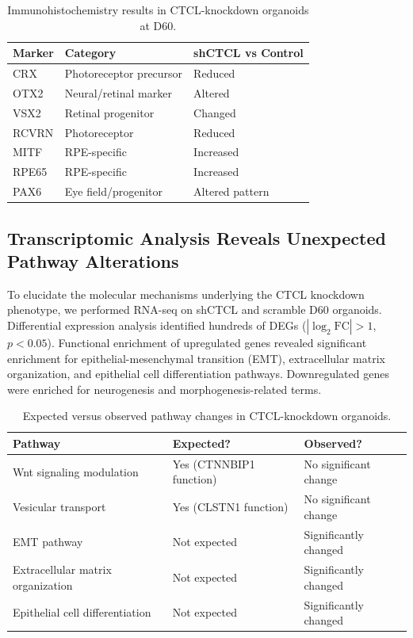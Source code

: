 \documentclass[12pt]{article}
\begin{document}
\begin{table}[htbp]
\centering
\caption{Immunohistochemistry results in CTCL-knockdown organoids at D60.}
\label{tab:ihc}
\begin{tabular}{lll}
\toprule
Marker & Category & shCTCL vs Control \\
\midrule
CRX & Photoreceptor precursor & Reduced \\
OTX2 & Neural/retinal marker & Altered \\
VSX2 & Retinal progenitor & Changed \\
RCVRN & Photoreceptor & Reduced \\
MITF & RPE-specific & Increased \\
RPE65 & RPE-specific & Increased \\
PAX6 & Eye field/progenitor & Altered pattern \\
\bottomrule
\end{tabular}
\end{table}

\subsection{Transcriptomic Analysis Reveals Unexpected Pathway Alterations}

To elucidate the molecular mechanisms underlying the CTCL knockdown phenotype, we performed RNA-seq on shCTCL and scramble D60 organoids. Differential expression analysis identified hundreds of DEGs ($|\log_2\text{FC}| > 1$, $p < 0.05$). Functional enrichment of upregulated genes revealed significant enrichment for epithelial-mesenchymal transition (EMT), extracellular matrix organization, and epithelial cell differentiation pathways. Downregulated genes were enriched for neurogenesis and morphogenesis-related terms.

\begin{table}[htbp]
\centering
\caption{Expected versus observed pathway changes in CTCL-knockdown organoids.}
\label{tab:pathways}
\begin{tabular}{lll}
\toprule
Pathway & Expected? & Observed? \\
\midrule
Wnt signaling modulation & Yes (CTNNBIP1 function) & No significant change \\
Vesicular transport & Yes (CLSTN1 function) & No significant change \\
EMT pathway & Not expected & Significantly changed \\
Extracellular matrix organization & Not expected & Significantly changed \\
Epithelial cell differentiation & Not expected & Significantly changed \\
\bottomrule
\end{tabular}
\end{table}
\end{document}
